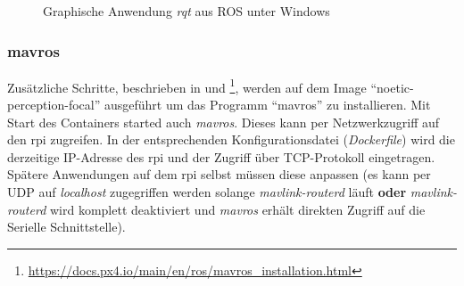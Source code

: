 \begin{figure}[h!]
    \centering
    \caption{Graphische Anwendung \textit{rqt} aus ROS unter Windows}
    \label{fig:rqt}
\end{figure}

\subsubsection{mavros}
Zusätzliche Schritte, beschrieben in \cite{dronecodestiftungObstacleDetectionAvoidance2023} und \footnote{\url{https://docs.px4.io/main/en/ros/mavros_installation.html}\cite{dronecodestiftungPX4UserGuide}}, werden auf dem Image \enquote{noetic-perception-focal} ausgeführt um das Programm \enquote{mavros} zu installieren. Mit Start des Containers started auch \textit{mavros}. Dieses kann per Netzwerkzugriff auf den \gls{rpi} zugreifen. In der entsprechenden Konfigurationsdatei (\textit{Dockerfile}) wird die derzeitige IP-Adresse des \gls{rpi} und der Zugriff über TCP-Protokoll eingetragen. Spätere Anwendungen auf dem \gls{rpi} selbst müssen diese anpassen (es kann per UDP auf \textit{localhost} zugegriffen werden solange \textit{mavlink-routerd} läuft \textbf{oder} \textit{mavlink-routerd} wird komplett deaktiviert und \textit{mavros} erhält direkten Zugriff auf die Serielle Schnittstelle).

